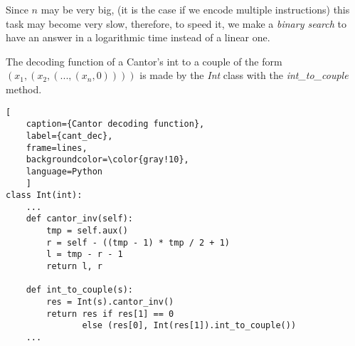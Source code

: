 Since $n$ may be very big, (it is the case if we encode multiple instructions) this task may become very slow, therefore, to speed it, we make a \textit{binary search} to have an answer in a logarithmic time instead of a linear one. 

The decoding function of a Cantor's int to a couple of the form $(x_1, (x_2, (..., (x_n, 0))))$ is made by the \textit{Int} class with the \textit{int\_to\_couple} method.
\newpage
\begin{lstlisting}[
    caption={Cantor decoding function}, 
    label={cant_dec},
    frame=lines,
    backgroundcolor=\color{gray!10},
    language=Python
    ]
class Int(int):
    ...
    def cantor_inv(self):
        tmp = self.aux()
        r = self - ((tmp - 1) * tmp / 2 + 1)
        l = tmp - r - 1
        return l, r
    
    def int_to_couple(s):
        res = Int(s).cantor_inv()
        return res if res[1] == 0 
               else (res[0], Int(res[1]).int_to_couple())
    ...
\end{lstlisting}